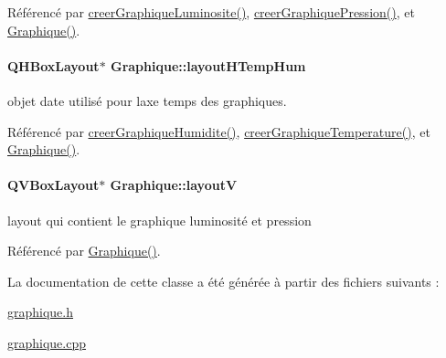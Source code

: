 Référencé par \hyperlink{class_graphique_a3b55b9c4732856e1b25bef167c25ac4c}{creer\+Graphique\+Luminosite()}, \hyperlink{class_graphique_adc50b5ae7a54dd576c99e74ec6bf74c5}{creer\+Graphique\+Pression()}, et \hyperlink{class_graphique_a3aec0a5aaae78f0726771dea67af69b4}{Graphique()}.

\paragraph[{\texorpdfstring{layout\+H\+Temp\+Hum}{layoutHTempHum}}]{\setlength{\rightskip}{0pt plus 5cm}Q\+H\+Box\+Layout$\ast$ Graphique\+::layout\+H\+Temp\+Hum\hspace{0.3cm}{\ttfamily [private]}}\hypertarget{class_graphique_a1ccd9268372eef81a117bd82b50bec6a}{}\label{class_graphique_a1ccd9268372eef81a117bd82b50bec6a}
objet date utilisé pour l\textquotesingle{}axe temps des graphiques. 

Référencé par \hyperlink{class_graphique_a19d6deef2d11e95093a343d49f75d14e}{creer\+Graphique\+Humidite()}, \hyperlink{class_graphique_ad9b976804bafcbfe451d89fd35729d16}{creer\+Graphique\+Temperature()}, et \hyperlink{class_graphique_a3aec0a5aaae78f0726771dea67af69b4}{Graphique()}.

\paragraph[{\texorpdfstring{layoutV}{layoutV}}]{\setlength{\rightskip}{0pt plus 5cm}Q\+V\+Box\+Layout$\ast$ Graphique\+::layoutV\hspace{0.3cm}{\ttfamily [private]}}\hypertarget{class_graphique_a2a8dbb06be361da2b8a500f231c1c607}{}\label{class_graphique_a2a8dbb06be361da2b8a500f231c1c607}
layout qui contient le graphique luminosité et pression 

Référencé par \hyperlink{class_graphique_a3aec0a5aaae78f0726771dea67af69b4}{Graphique()}.



La documentation de cette classe a été générée à partir des fichiers suivants \+:\begin{DoxyCompactItemize}
\item 
\hyperlink{graphique_8h}{graphique.\+h}\item 
\hyperlink{graphique_8cpp}{graphique.\+cpp}\end{DoxyCompactItemize}
